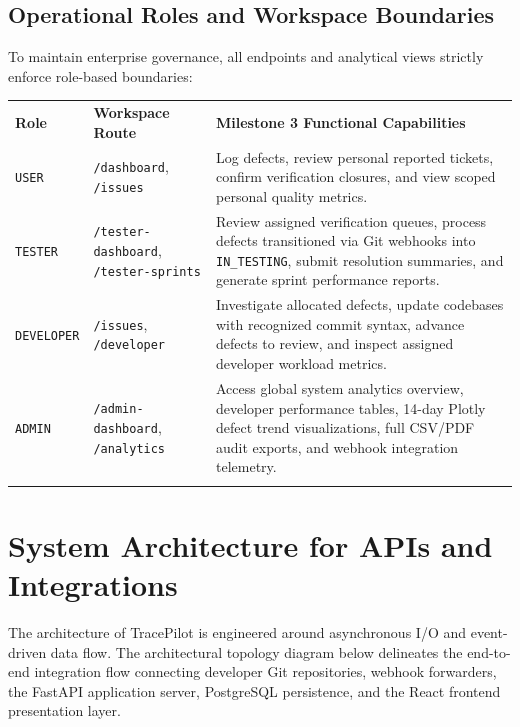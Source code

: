 \documentclass[11pt,a4paper]{article}
\providecommand{\toprule}{\noalign{\hrule height 1.2pt}}
\providecommand{\midrule}{\noalign{\hrule height 0.6pt}}
\providecommand{\bottomrule}{\noalign{\hrule height 1.2pt}}
\providecommand{\addlinespace}{\vspace{4pt}}
\begin{document}
\subsection{Operational Roles and Workspace Boundaries}
To maintain enterprise governance, all endpoints and analytical views strictly enforce role-based boundaries:
\begin{center}
\small
\begin{tabularx}{\textwidth}{lp{3.5cm}X}
\toprule
\textbf{Role} & \textbf{Workspace Route} & \textbf{Milestone 3 Functional Capabilities} \\
\midrule
\texttt{USER} & \texttt{/dashboard}, \texttt{/issues} & Log defects, review personal reported tickets, confirm verification closures, and view scoped personal quality metrics. \\
\addlinespace
\texttt{TESTER} & \texttt{/tester-dashboard}, \texttt{/tester-sprints} & Review assigned verification queues, process defects transitioned via Git webhooks into \texttt{IN\_TESTING}, submit resolution summaries, and generate sprint performance reports. \\
\addlinespace
\texttt{DEVELOPER} & \texttt{/issues}, \texttt{/developer} & Investigate allocated defects, update codebases with recognized commit syntax, advance defects to review, and inspect assigned developer workload metrics. \\
\addlinespace
\texttt{ADMIN} & \texttt{/admin-dashboard}, \texttt{/analytics} & Access global system analytics overview, developer performance tables, 14-day Plotly defect trend visualizations, full CSV/PDF audit exports, and webhook integration telemetry. \\
\bottomrule
\end{tabularx}
\end{center}

\section{System Architecture for APIs and Integrations}
The architecture of TracePilot is engineered around asynchronous I/O and event-driven data flow. The architectural topology diagram below delineates the end-to-end integration flow connecting developer Git repositories, webhook forwarders, the FastAPI application server, PostgreSQL persistence, and the React frontend presentation layer.
\end{document}
